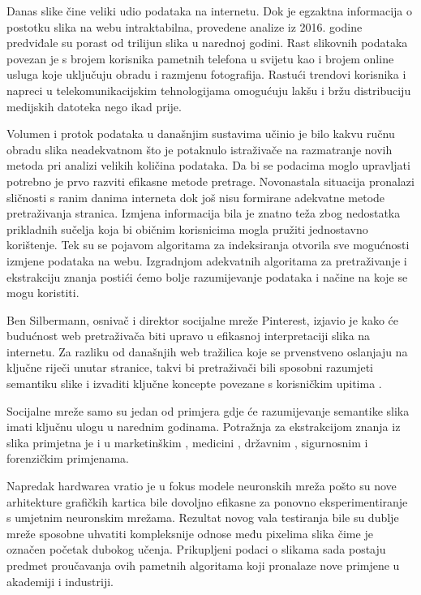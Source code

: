 \documentclass[times, utf8, proizvoljni, numeric]{fer}
\begin{document}
Danas slike čine veliki udio podataka na internetu. Dok je egzaktna informacija o postotku slika na webu intraktabilna, provedene analize iz 2016. godine \cite{img-analysis} predviđale su porast od trilijun slika u narednoj godini. Rast slikovnih podataka povezan je s brojem korisnika pametnih telefona u svijetu kao i brojem online usluga koje uključuju obradu i razmjenu fotografija. Rastući trendovi korisnika \cite{net-users} i napreci u telekomunikacijskim tehnologijama omogućuju lakšu i bržu distribuciju medijskih datoteka nego ikad prije. 

Volumen i protok podataka u današnjim sustavima učinio je bilo kakvu ručnu obradu slika neadekvatnom što je potaknulo istraživače na razmatranje novih metoda pri analizi velikih količina podataka. Da bi se podacima moglo upravljati potrebno je prvo razviti efikasne metode pretrage. Novonastala situacija pronalazi sličnosti s ranim danima interneta dok još nisu formirane adekvatne metode pretraživanja stranica. Izmjena informacija bila je znatno teža zbog nedostatka prikladnih sučelja koja bi običnim korisnicima mogla pružiti jednostavno korištenje. Tek su se pojavom algoritama za indeksiranja otvorila sve mogućnosti izmjene podataka na webu. Izgradnjom adekvatnih algoritama za pretraživanje i ekstrakciju znanja postići ćemo bolje razumijevanje podataka i načine na koje se mogu koristiti. 

Ben Silbermann, osnivač i direktor socijalne mreže Pinterest, izjavio je kako će budućnost web pretraživača biti upravo u efikasnoj interpretaciji slika na internetu. Za razliku od današnjih web tražilica koje se prvenstveno oslanjaju na ključne riječi unutar stranice, takvi bi pretraživači bili sposobni razumjeti semantiku slike i izvaditi ključne koncepte povezane s korisničkim upitima \cite{internet-trends}.

Socijalne mreže samo su jedan od primjera gdje će razumijevanje semantike slika imati ključnu ulogu u narednim godinama. Potražnja za ekstrakcijom znanja iz slika primjetna je i u marketinškim \cite{electronic-commerce-application}, medicini \cite{medical-application} \cite{medical-diagnostics-application}, državnim \cite{smart-city-application}, sigurnosnim \cite{security-application} i forenzičkim \cite{forensics-application} primjenama. 

Napredak hardwarea vratio je u fokus modele neuronskih mreža pošto su nove arhitekture grafičkih kartica bile dovoljno efikasne za ponovno eksperimentiranje s umjetnim neuronskim mrežama. Rezultat novog vala testiranja bile su dublje mreže sposobne uhvatiti kompleksnije odnose među pixelima slika čime je označen početak dubokog učenja. Prikupljeni podaci o slikama sada postaju predmet proučavanja ovih pametnih algoritama koji pronalaze nove primjene u akademiji i industriji. 
\end{document}
